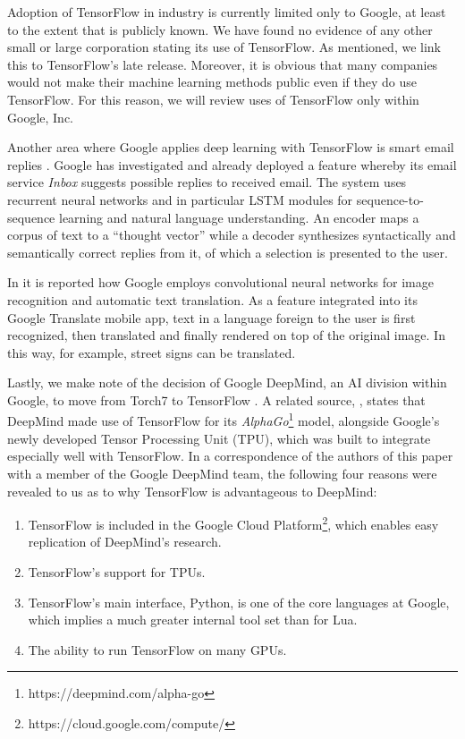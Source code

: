 Adoption of TensorFlow in industry is currently limited only to Google, at least
to the extent that is publicly known. We have found no evidence of any other
small or large corporation stating its use of TensorFlow. As mentioned, we link
this to TensorFlow's late release. Moreover, it is obvious that many companies
would not make their machine learning methods public even if they do use
TensorFlow. For this reason, we will review uses of TensorFlow only within
Google, Inc.

Another area where Google applies deep learning with TensorFlow is smart email
replies \cite{emails}. Google has investigated and already deployed a feature
whereby its email service \emph{Inbox} suggests possible replies to received
email. The system uses recurrent neural networks and in particular LSTM modules
for sequence-to-sequence learning and natural language understanding. An encoder
maps a corpus of text to a ``thought vector'' while a decoder synthesizes
syntactically and semantically correct replies from it, of which a selection is
presented to the user.

In \cite{phones} it is reported how Google employs convolutional neural networks
for image recognition and automatic text translation. As a feature integrated
into its Google Translate mobile app, text in a language foreign to the user is
first recognized, then translated and finally rendered on top of the original
image. In this way, for example, street signs can be translated.

Lastly, we make note of the decision of Google DeepMind, an AI division within
Google, to move from Torch7 to TensorFlow \cite{deepmind}. A related source,
\cite{tpu}, states that DeepMind made use of TensorFlow for its
\emph{AlphaGo}\footnote{https://deepmind.com/alpha-go} model, alongside Google's
newly developed Tensor Processing Unit (TPU), which was built to integrate
especially well with TensorFlow. In a correspondence of the authors of this
paper with a member of the Google DeepMind team, the following four reasons were
revealed to us as to why TensorFlow is advantageous to DeepMind:

\begin{enumerate}
\item TensorFlow is included in the Google Cloud
  Platform\footnote{https://cloud.google.com/compute/}, which enables easy
  replication of DeepMind's research.
\item TensorFlow's support for TPUs.
\item TensorFlow's main interface, Python, is one of the core languages at
  Google, which implies a much greater internal tool set than for Lua.
\item The ability to run TensorFlow on many GPUs.
\end{enumerate}

